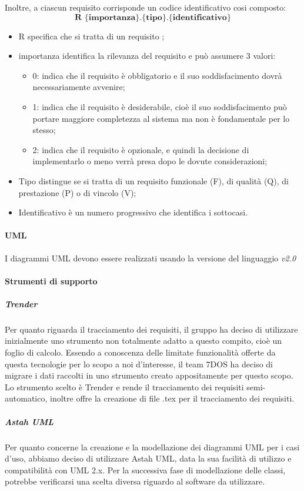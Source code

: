 Inoltre, a ciascun requisito corrisponde un codice identificativo cosi composto:
$$ \textbf{R \{importanza\}.\{tipo\}.\{identificativo\}  } $$
\begin{itemize}
	\item R specifica che si tratta di un requisito ;
	\item importanza identifica la rilevanza del requisito e può assumere 3 valori:
	\begin{itemize}
		\item 0: indica che il requisito è obbligatorio e il suo soddisfacimento dovrà necessariamente avvenire;
		\item 1: indica che il requisito è desiderabile, cioè il suo soddisfacimento può portare maggiore completezza al sistema ma non è fondamentale per lo stesso;
		\item 2: indica che il requisito è opzionale, e quindi la decisione di implementarlo o meno verrà presa dopo le dovute considerazioni;
	\end{itemize}
	\item Tipo distingue se si tratta di un requisito funzionale (F), di qualità (Q), di prestazione (P) o di vincolo (V);
	\item Identificativo è un numero progressivo che identifica i sottocasi.
\end{itemize}
\paragraph{UML}\Spazio
I diagrammi UML devono essere realizzati usando la versione del linguaggio \emph{v2.0}
\paragraph{Strumenti di supporto}
\subparagraph{Trender}\Spazio
Per quanto riguarda il tracciamento dei requisiti, il gruppo ha deciso di utilizzare inizialmente uno strumento non totalmente adatto a questo compito, cioè un foglio di calcolo. Essendo a conoscenza delle limitate funzionalità offerte da questa tecnologie per lo scopo a noi d'interesse, il team 7DOS ha deciso di migrare i dati raccolti in uno strumento creato appositamente per questo scopo. Lo strumento scelto è Trender e rende il tracciamento dei requisiti semi-automatico, inoltre offre la creazione di file .tex per il tracciamento dei requisiti.
\subparagraph{Astah UML}\Spazio
Per quanto concerne la creazione e la modellazione dei diagrammi UML per i casi d'uso, abbiamo deciso di utilizzare Astah UML, data la sua facilità di utilizzo e compatibilità con UML 2.x. Per la successiva fase di modellazione delle classi, potrebbe verificarsi una scelta diversa riguardo al software da utilizzare.
